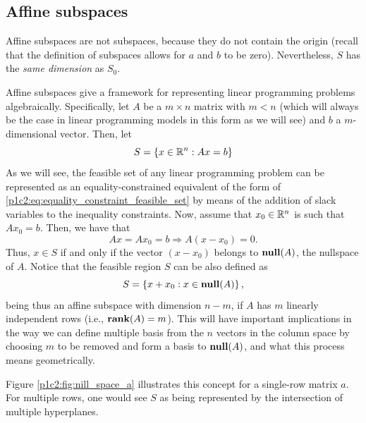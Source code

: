 \subsection{Affine subspaces}

Affine subspaces are not subspaces, because they do not contain the origin (recall that the definition of subspaces allows for $a$ and $b$ to be zero). Nevertheless, $S$ has the \emph{same dimension} as $S_0$.

Affine subspaces give a framework for representing linear programming problems algebraically.  Specifically, let $A$ be a $m \times n$ matrix with $m < n$ (which will always be the case in linear programming models in this form as we will see) and $b$ a $m$-dimensional vector. Then, let 
%
\begin{equation} \label{p1c2:eq:equality_constraint_feasible_set}
	S = \left\{ x \in \mathbb{R}^n : Ax = b \right \}		
\end{equation}
%
As we will see, the feasible set of any linear programming problem can be represented as an equality-constrained equivalent of the form of \eqref{p1c2:eq:equality_constraint_feasible_set} by means of the addition of slack variables to the inequality constraints. Now, assume that $x_0 \in \mathbb{R}^n$ is such that $Ax_0 = b$.  Then, we have that 
%
\begin{equation*}
	Ax = Ax_0 = b \Rightarrow A(x - x_0) = 0.	
\end{equation*}
%
Thus, $x \in S$ if and only if the vector $(x - x_0)$ belongs to $\mathop{\bf null}(A)$, the nullspace of $A$. Notice that the feasible region $S$ can be also defined as 
%
\begin{equation*}
	S = \left\{ x + x_0 : x \in \mathop{\bf null}(A) \right \},	
\end{equation*}
%
being thus an affine subspace with dimension $n-m$, if $A$ has $m$ linearly independent rows (i.e., $\mathop{\bf rank}(A)=m$). This will have important implications in the way we can define multiple basis from the $n$ vectors in the column space by choosing $m$ to be removed and form a basis to $\mathop{\bf null}(A)$, and what this process means geometrically.

Figure \ref{p1c2:fig:nill_space_a} illustrates this concept for a single-row matrix $a$. For multiple rows, one would see $S$ as being represented by the intersection of multiple hyperplanes.

